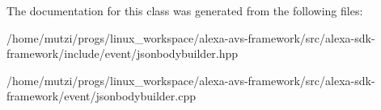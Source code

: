 The documentation for this class was generated from the following files\+:\begin{DoxyCompactItemize}
\item 
/home/mutzi/progs/linux\+\_\+workspace/alexa-\/avs-\/framework/src/alexa-\/sdk-\/framework/include/event/jsonbodybuilder.\+hpp\item 
/home/mutzi/progs/linux\+\_\+workspace/alexa-\/avs-\/framework/src/alexa-\/sdk-\/framework/event/jsonbodybuilder.\+cpp\end{DoxyCompactItemize}
